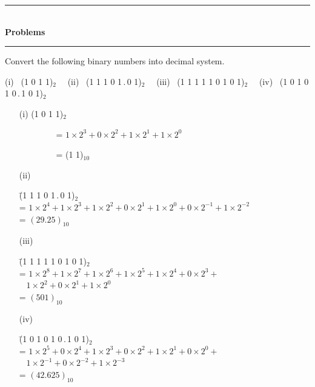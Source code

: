 \begin{center}
\rule{4cm}{1pt}\\
{\bf\Large Problems}\\[-3pt]
\rule{4cm}{1pt}
\end{center}

\begin{problem}\label{prob5.1}
Convert the following binary numbers into decimal system.

\medskip
\noindent
(i)~ (1 0 1 1)$_{2}$\hfil~~ (ii)~ (1 1 1 0 1\,.\,0 1)$_{2}$\hfil~~
(iii)~  (1 1 1 1 1 0 1 0 1)$_{2}$\hfil~~ (iv)~ (1 0 1 0 1 0\,.\,1 0 1)$_{2}$
\end{problem}

\begin{solution}
\begin{itemize}
\item[(i)] (1 0 1 1)$_{2}$

\qquad~~~~~~~~ = $1\times 2^{3}+0\times 2^{2}+1\times 2^{1}+1\times 2^{0}$

\qquad~~~~~~~~ = (1 1)$_{10}$

\item[(ii)]
\begin{tabbing}
\= (1 1 1 0 1\,.\,0 1)$_{2}$\\[3pt]
\> = $1\times 2^{4}+1\times 2^{3}+1\times 2^{2}+0\times 2^{1}+1\times 2^{0}+0\times 2^{-1}+1\times 2^{-2}$\\[3pt]
\> = $(29.25)_{10}$
\end{tabbing}

\item[(iii)]
\begin{tabbing}
\= (1 1 1 1 1 0 1 0 1)$_{2}$\\[3pt]
\>= $1\times 2^{8}+1\times 2^{7}+1\times 2^{6}+1\times 2^{5}+1\times 2^{4}+0\times 2^{3}+$\\[3pt]
\>~ $1\times 2^{2}+0\times 2^{1}+1\times 2^{0}$\\[3pt]
\>= $(501)_{10}$
\end{tabbing}

\item[(iv)]
\begin{tabbing}
\= (1 0 1 0 1 0\,.\,1 0 1)$_{2}$\\[3pt]
\>= $1\times 2^{5}+0\times 2^{4}+1\times 2^{3}+0\times 2^{2}+1\times 2^{1}+0\times 2^{0}+$\\[3pt]
\>~ $1\times 2^{-1}+0\times 2^{-2}+1\times 2^{-3}$\\[3pt]
\>= $(42.625)_{10}$
\end{tabbing}
\end{itemize}
\end{solution}

